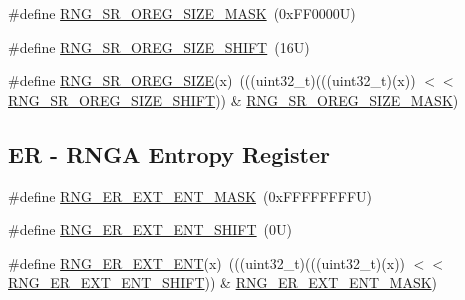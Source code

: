 \begin{DoxyCompactItemize}
\item 
\#define \mbox{\hyperlink{group___r_n_g___register___masks_ga2f35d6883145b930c34d949640694a6f}{R\+N\+G\+\_\+\+S\+R\+\_\+\+O\+R\+E\+G\+\_\+\+S\+I\+Z\+E\+\_\+\+M\+A\+SK}}~(0x\+F\+F0000\+U)
\item 
\#define \mbox{\hyperlink{group___r_n_g___register___masks_ga7bd0f51640dd8184fdc95b687473e7d6}{R\+N\+G\+\_\+\+S\+R\+\_\+\+O\+R\+E\+G\+\_\+\+S\+I\+Z\+E\+\_\+\+S\+H\+I\+FT}}~(16\+U)
\item 
\#define \mbox{\hyperlink{group___r_n_g___register___masks_ga8fe3b65a512da2f37a4a9ae03b4e4f40}{R\+N\+G\+\_\+\+S\+R\+\_\+\+O\+R\+E\+G\+\_\+\+S\+I\+ZE}}(x)~(((uint32\+\_\+t)(((uint32\+\_\+t)(x)) $<$$<$ \mbox{\hyperlink{group___r_n_g___register___masks_ga7bd0f51640dd8184fdc95b687473e7d6}{R\+N\+G\+\_\+\+S\+R\+\_\+\+O\+R\+E\+G\+\_\+\+S\+I\+Z\+E\+\_\+\+S\+H\+I\+FT}})) \& \mbox{\hyperlink{group___r_n_g___register___masks_ga2f35d6883145b930c34d949640694a6f}{R\+N\+G\+\_\+\+S\+R\+\_\+\+O\+R\+E\+G\+\_\+\+S\+I\+Z\+E\+\_\+\+M\+A\+SK}})
\end{DoxyCompactItemize}
\subsection*{ER -\/ R\+N\+GA Entropy Register}
\begin{DoxyCompactItemize}
\item 
\#define \mbox{\hyperlink{group___r_n_g___register___masks_gab27d57cff82acd0615707b3a53c7cce0}{R\+N\+G\+\_\+\+E\+R\+\_\+\+E\+X\+T\+\_\+\+E\+N\+T\+\_\+\+M\+A\+SK}}~(0x\+F\+F\+F\+F\+F\+F\+F\+F\+U)
\item 
\#define \mbox{\hyperlink{group___r_n_g___register___masks_gae01cc719557411c3218c33e4b855b790}{R\+N\+G\+\_\+\+E\+R\+\_\+\+E\+X\+T\+\_\+\+E\+N\+T\+\_\+\+S\+H\+I\+FT}}~(0\+U)
\item 
\#define \mbox{\hyperlink{group___r_n_g___register___masks_ga308a2ffad2128aec4f7883f9f1289940}{R\+N\+G\+\_\+\+E\+R\+\_\+\+E\+X\+T\+\_\+\+E\+NT}}(x)~(((uint32\+\_\+t)(((uint32\+\_\+t)(x)) $<$$<$ \mbox{\hyperlink{group___r_n_g___register___masks_gae01cc719557411c3218c33e4b855b790}{R\+N\+G\+\_\+\+E\+R\+\_\+\+E\+X\+T\+\_\+\+E\+N\+T\+\_\+\+S\+H\+I\+FT}})) \& \mbox{\hyperlink{group___r_n_g___register___masks_gab27d57cff82acd0615707b3a53c7cce0}{R\+N\+G\+\_\+\+E\+R\+\_\+\+E\+X\+T\+\_\+\+E\+N\+T\+\_\+\+M\+A\+SK}})
\end{DoxyCompactItemize}
